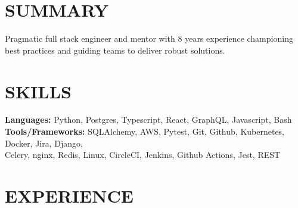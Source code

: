 \documentclass[]{resume}
\begin{document}
\begin{resume}
\setlength{\sectionskip}{1.30em}
\section{SUMMARY\makebox[387 px]{\rule[.5 ex]{387 px}{1.0pt}}}
Pragmatic full stack engineer and mentor with 8 years experience championing best practices and guiding teams to deliver robust solutions. 
\section{SKILLS\makebox[416 px]{\rule[.5 ex]{416 px}{1.0pt}}}
\vspace{0.9mm}
\textbf{Languages:} \hspace*{11.5mm}
Python, Postgres, Typescript, React, GraphQL, Javascript, Bash \\
% 
\textbf{Tools/Frameworks:} SQLAlchemy, AWS, Pytest, Git, Github, Kubernetes, Docker, Jira, Django, \\
\hspace*{32mm}Celery, nginx, Redis, Linux, CircleCI, Jenkins, Github Actions, Jest, REST
\section{EXPERIENCE\makebox[372 px]{\rule[.5 ex]{372 px}{1.0pt}}}


\end{resume}
\end{document}
